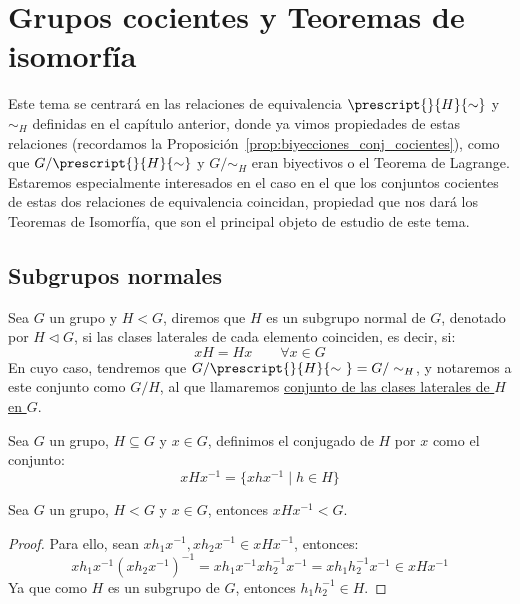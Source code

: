 \chapter{Grupos cocientes y Teoremas de isomorfía}
Este tema se centrará en las relaciones de equivalencia $\prescript{}{H}{\sim}$ y $\sim_H$ definidas en el capítulo anterior, donde ya vimos propiedades de estas relaciones (recordamos la Proposición~\ref{prop:biyecciones_conj_cocientes}), como que $G/\prescript{}{H}{\sim}$ y $G/\sim_H$ eran biyectivos o el Teorema de Lagrange. Estaremos especialmente interesados en el caso en el que los conjuntos cocientes de estas dos relaciones de equivalencia coincidan, propiedad que nos dará los Teoremas de Isomorfía, que son el principal objeto de estudio de este tema.

\section{Subgrupos normales}
\begin{definicion}
    Sea $G$ un grupo y $H<G$, diremos que $H$ es un subgrupo normal de $G$, denotado por $H \lhd G$, si las clases laterales de cada elemento coinciden, es decir, si:
    \begin{equation*}
        xH = Hx \qquad \forall x\in G
    \end{equation*}
    En cuyo caso, tendremos que $G/\prescript{}{H}{\sim\ } = G/\sim_H$, y notaremos a este conjunto como $G/H$, al que llamaremos \underline{conjunto de las clases laterales de $H$ en $G$}. 
\end{definicion}

\begin{definicion}[Conjugado]
    Sea $G$ un grupo, $H\subseteq G$ y $x\in G$, definimos el conjugado de $H$ por $x$ como el conjunto:
    \begin{equation*}
        xHx^{-1} = \{xhx^{-1} \mid h\in H\}
    \end{equation*}
\end{definicion}

\begin{prop}\label{prop:xHx_subgrupo}
    Sea $G$ un grupo, $H<G$ y $x\in G$, entonces $xHx^{-1}< G$.
    \begin{proof}
        Para ello, sean $xh_1x^{-1}, xh_2x^{-1}\in xHx^{-1}$, entonces:
        \begin{equation*}
            xh_1x^{-1}{(xh_2x^{-1})}^{-1} = xh_1x^{-1}xh_2^{-1}x^{-1} = xh_1h_2^{-1}x^{-1} \in xHx^{-1}
        \end{equation*}
        Ya que como $H$ es un subgrupo de $G$, entonces $h_1h_2^{-1}\in H$.
    \end{proof}
\end{prop}~\\

